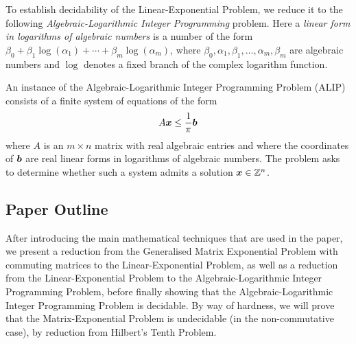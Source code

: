 To establish decidability of the Linear-Exponential Problem, we reduce
it to the following
\emph{Algebraic-Logarithmic Integer Programming}
problem.  Here a \emph{linear form in logarithms of algebraic numbers}
is a number of the form
$\beta_{0} + \beta_{1} \log(\alpha_{1}) + \cdots + \beta_{m}
\log(\alpha_{m})$,
where
$\beta_{0}, \alpha_{1}, \beta_{1}, \ldots, \alpha_{m}, \beta_{m}$ are
algebraic numbers and $\log$ denotes a fixed branch of the complex
logarithm function.



\begin{definition}
An instance of the Algebraic-Logarithmic Integer Programming Problem (ALIP) consists of a finite system of equations of the form
\begin{align*}
A \boldsymbol{x} \leq \frac{1}{\pi} \boldsymbol{b}
\end{align*}
where $A$ is an $m\times n$ matrix with real algebraic entries and
where the coordinates of $\boldsymbol{b}$ are real linear forms in
logarithms of algebraic numbers. The problem asks to determine whether
such a system admits a solution $\boldsymbol{x} \in \mathbb{Z}^{n}$.
\end{definition}

\subsection{Paper Outline}

After introducing the main mathematical techniques that are used in
the paper, we present a reduction from the Generalised Matrix
Exponential Problem with commuting matrices to the Linear-Exponential
Problem, as well as a reduction from the Linear-Exponential Problem to
the Algebraic-Logarithmic Integer Programming Problem, before finally showing that the Algebraic-Logarithmic Integer Programming Problem is decidable. By way of hardness, we will prove that the Matrix-Exponential Problem is
undecidable (in the non-commutative case), by reduction from Hilbert's
Tenth Problem.
